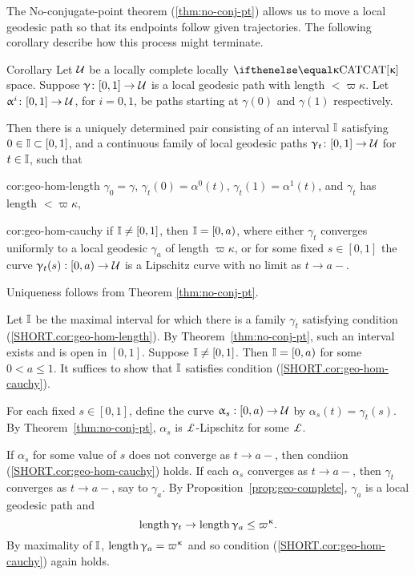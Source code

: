 The No-conjugate-point theorem (\ref{thm:no-conj-pt}) allows us to move a local geodesic path 
so that its endpoints follow given trajectories.
The following corollary describe how this process might terminate. 

\begin{thm}{Corollary}\label{cor:geo-hom}
Let $\mathcal{U}$ be a locally complete locally $\CAT\kappa$ space.
Suppose $\gamma\:[0,1]\to\spc{U}$ is a local geodesic path with length $< \varpi\kappa$.  Let $\alpha^i\:[0,1]\to \spc{U}$, for $i=0,1$, be paths starting at $\gamma(0)$ and $\gamma(1)$ respectively.  

Then there is a uniquely determined pair consisting of an interval $\mathbb{I} $ satisfying $0\in \II\subset[0,1]$, and a continuous family of local geodesic paths $\gamma_t\:[0,1]\to \spc{U}$ for  $t\in \II$, such that  

\begin{subthm}{cor:geo-hom-length}
$\gamma_0=\gamma$, $\gamma_t(0)=\alpha^0(t)$, $\gamma_t(1)=\alpha^1(t)$, and $\gamma_t$ has length $< \varpi\kappa$,
\end{subthm} 

\begin{subthm}{cor:geo-hom-cauchy}
if $\mathbb{I}\ne [0,1]$, then $\mathbb{I}=[0, a)$, where either $\gamma_t$ converges uniformly to a local geodesic $\gamma_a$ of length $\varpi\kappa$, or 
for some fixed $s\in [0,1]$ the curve $\gamma_t(s):[0,a)\to\spc{U}$ is a Lipschitz curve with no limit as $t\to a-$.
\end{subthm}

\end{thm}


 Uniqueness follows from  Theorem \ref{thm:no-conj-pt}.

Let $\mathbb{I}$ be the maximal interval for which there is a family $\gamma_t$ satisfying condition (\ref{SHORT.cor:geo-hom-length}). 
By Theorem~\ref{thm:no-conj-pt}, such an interval exists and is open in $[0,1]$.  Suppose $\mathbb{I}\ne[0,1]$. Then  $\mathbb{I}=[0,a)$ for some $0<a\le 1$.  It suffices to show that $\mathbb{I}$ satisfies condition (\ref{SHORT.cor:geo-hom-cauchy}).

For each fixed $s\in [0,1]$, define the curve $\alpha_s:[0,a)\to\spc{U}$ by $\alpha_s(t)=\gamma_t(s)$. 
By Theorem~\ref{thm:no-conj-pt}, 
$\alpha_s$ is $ \Lip$-Lipschitz for some $\Lip$.  

If $\alpha_s$  for some value of $s$ does not converge as $t\to a-$, then condiion (\ref{SHORT.cor:geo-hom-cauchy}) holds.  If each $\alpha_s$  converges as $t\to a-$,  
 then $ \gamma_t$ converges as $t\to a-$, say to $\gamma_a$.
By  Proposition~\ref{prop:geo-complete}, $\gamma_a$ is a local geodesic path and\[\length\gamma_t\to\length\gamma_a\le \varpi\kappa.\]
By maximality of $\mathbb{I}$, $\length\gamma_a=\varpi\kappa$ and so condition (\ref{SHORT.cor:geo-hom-cauchy}) again holds.
\qeds

